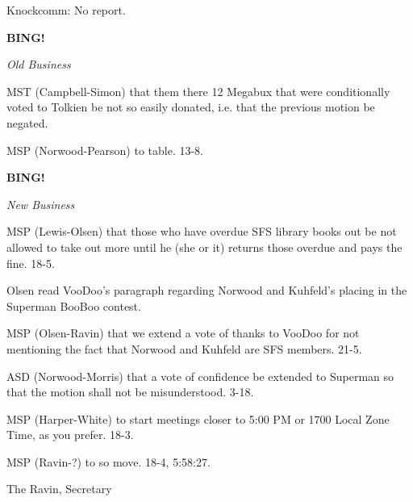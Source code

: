 \documentclass[12pt]{article}
\newcommand{\bing}{{\bf BING!} }
\newcommand{\goto}[1]{\bing \vskip 12pt \centerline{{\em{#1}}}}
\begin{document}
Knockcomm: No report.

\goto{Old Business}

MST (Campbell-Simon) that them there 12 Megabux that were conditionally voted to Tolkien be not so easily donated, i.e. that the previous motion be negated.

MSP (Norwood-Pearson) to table. 13-8.

\goto{New Business}

MSP (Lewis-Olsen) that those who have overdue SFS library books out be not allowed to take out more until he (she or it) returns those overdue and pays the fine. 18-5.

Olsen read VooDoo's paragraph regarding Norwood and Kuhfeld's placing in the Superman BooBoo contest.

MSP (Olsen-Ravin) that we extend a vote of thanks to VooDoo for not mentioning the fact that Norwood and Kuhfeld are SFS members. 21-5.

ASD (Norwood-Morris) that a vote of confidence be extended to Superman so that the motion shall not be misunderstood. 3-18.

MSP (Harper-White) to start meetings closer to 5:00 PM or 1700 Local Zone Time, as you prefer. 18-3.

MSP (Ravin-?) to so move. 18-4, 5:58:27.

\vspace{12pt}

\centerline{The Ravin, Secretary}
\end{document}
